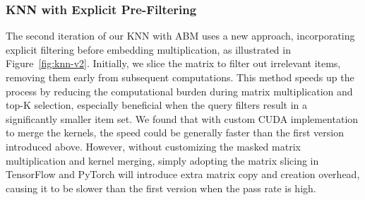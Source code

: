 \subsubsection{KNN with Explicit Pre-Filtering}\label{sec:prefilter}
The second iteration of our KNN with ABM uses a new approach, incorporating explicit filtering before embedding multiplication, as illustrated in Figure~\ref{fig:knn-v2}. Initially, we slice the matrix to filter out irrelevant items, removing them early from subsequent computations. This method speeds up the process by reducing the computational burden during matrix multiplication and top-K selection, especially beneficial when the query filters result in a significantly smaller item set. We found that with custom CUDA implementation \cite{shen2024learningretrievejobmatching} to merge the kernels, the speed could be generally faster than the first version introduced above. However, without customizing the masked matrix multiplication and kernel merging, simply adopting the matrix slicing in TensorFlow and PyTorch will introduce extra matrix copy and creation overhead, causing it to be slower than the first version when the pass rate is high.






